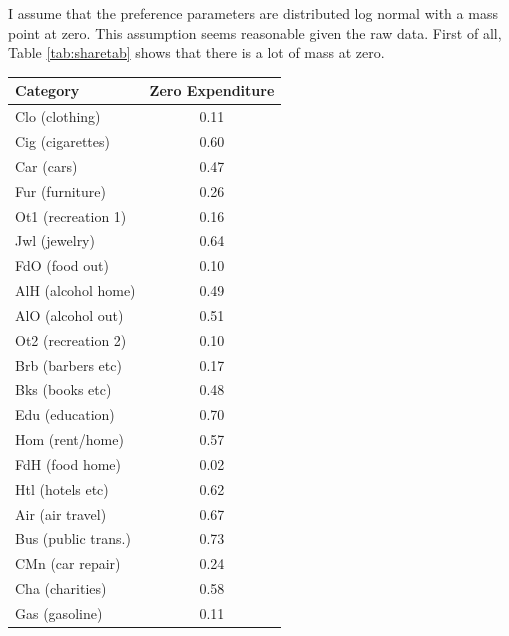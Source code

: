 \documentclass{article}
\begin{document}
I assume that the preference parameters are distributed log normal with a mass point at zero.
This assumption seems reasonable given the raw data.
First of all, Table \ref{tab:sharetab} shows that there is a lot of mass at zero.
\begin{table}
	\begin{center}
\begin{tabular}{|l|c|}
	\hline
\textbf{Category} & \textbf{Zero Expenditure} \\
	\hline
Clo (clothing) & 0.11 \\ 
	\hline
Cig (cigarettes) & 0.60 \\ 
	\hline
Car (cars) & 0.47 \\ 
	\hline
Fur (furniture) & 0.26 \\ 
	\hline
Ot1 (recreation 1) & 0.16 \\ 
	\hline
Jwl (jewelry) & 0.64 \\ 
	\hline
FdO (food out) & 0.10 \\ 
	\hline
AlH (alcohol home) & 0.49 \\ 
	\hline
AlO (alcohol out) & 0.51 \\ 
	\hline
Ot2 (recreation 2) & 0.10 \\ 
	\hline
Brb (barbers etc) & 0.17 \\ 
	\hline
Bks (books etc) & 0.48 \\ 
	\hline
Edu (education) & 0.70 \\ 
	\hline
Hom (rent/home) & 0.57 \\ 
	\hline
FdH (food home) & 0.02 \\ 
	\hline
Htl (hotels etc) & 0.62 \\ 
	\hline
Air (air travel) & 0.67 \\ 
	\hline
Bus (public trans.) & 0.73 \\ 
	\hline
CMn (car repair) & 0.24 \\ 
	\hline
Cha (charities) & 0.58 \\ 
	\hline
Gas (gasoline) & 0.11 \\ 

\end{tabular}
\end{center}
\end{table}
\end{document}

